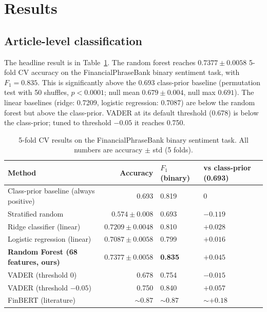 \documentclass{article}
\begin{document}
\section{Results}

\subsection{Article-level classification}

The headline result is in Table~\ref{tab:headline}. The random forest reaches $0.7377 \pm 0.0058$ 5-fold CV accuracy on the FinancialPhraseBank binary sentiment task, with $F_1 = 0.835$. This is significantly above the 0.693 class-prior baseline (permutation test with 50 shuffles, $p < 0.0001$; null mean $0.679 \pm 0.004$, null max $0.691$). The linear baselines (ridge: 0.7209, logistic regression: 0.7087) are below the random forest but above the class-prior. VADER at its default threshold (0.678) is below the class-prior; tuned to threshold $-0.05$ it reaches 0.750.

\begin{table}[ht]
\centering
\caption{5-fold CV results on the FinancialPhraseBank binary sentiment task. All numbers are accuracy $\pm$ std (5 folds).}
\label{tab:headline}
\small
\begin{tabular}{lrll}
\toprule
Method & Accuracy & $F_1$ (binary) & vs class-prior (0.693) \\
\midrule
Class-prior baseline (always positive) & 0.693 & 0.819 & 0 \\
Stratified random & $0.574 \pm 0.008$ & 0.693 & $-0.119$ \\
\midrule
Ridge classifier (linear) & $0.7209 \pm 0.0048$ & 0.810 & $+0.028$ \\
Logistic regression (linear) & $0.7087 \pm 0.0058$ & 0.799 & $+0.016$ \\
\textbf{Random Forest (68 features, ours)} & $\mathbf{0.7377 \pm 0.0058}$ & \textbf{0.835} & $\mathbf{+0.045}$ \\
\midrule
VADER (threshold 0) & 0.678 & 0.754 & $-0.015$ \\
VADER (threshold $-0.05$) & 0.750 & 0.840 & $+0.057$ \\
FinBERT (literature) & $\sim 0.87$ & $\sim 0.87$ & $\sim +0.18$ \\
\bottomrule
\end{tabular}
\end{table}
\end{document}
